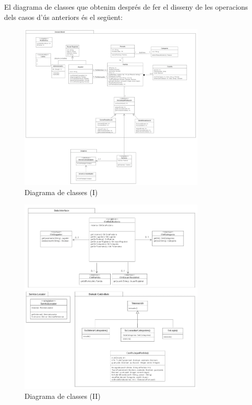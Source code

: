 El diagrama de classes que obtenim després de fer el disseny de les operacions dels casos d'ús anteriors és el següent:

\begin{figure}[h]
    \centering
    \includegraphics[width=0.8\textwidth]{figures/domain1.png}
    \caption{Diagrama de classes (I)}
\end{figure}

\begin{figure}[h]
    \centering
    \includegraphics[width=0.8\textwidth]{figures/domain2.png}
    \caption{Diagrama de classes (II)}
\end{figure}